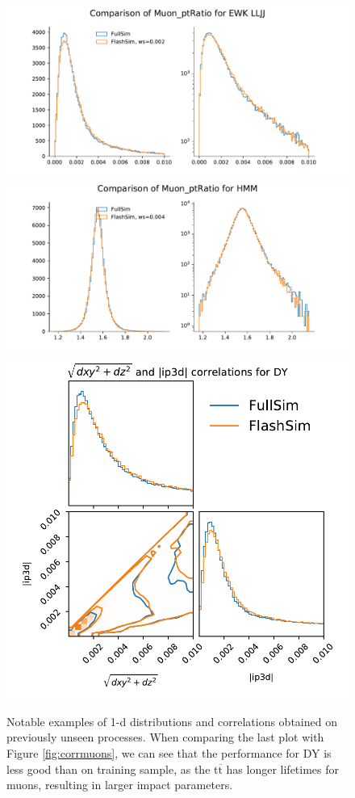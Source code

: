 \begin{figure}
    \myfloatalign
    \includegraphics[width=\linewidth]{gfx/ch5/ewkeval7.pdf} \\
    \includegraphics[width=\linewidth]{gfx/ch5/hmmeval2.pdf} \\
    \includegraphics[width=\linewidth]{gfx/ch5/dycorrs.pdf} 
    \caption[1-d distributions and correlations for new processes]{Notable examples of 1-d distributions and correlations obtained on previously unseen processes. When comparing the last plot with Figure \ref{fig:corrmuons}, we can see that the performance for DY is less good than on training sample, as the t$\overline{\text{t}}$ has longer lifetimes for muons, resulting in larger impact parameters.}\label{fig:newsdists}
    

\end{figure}
